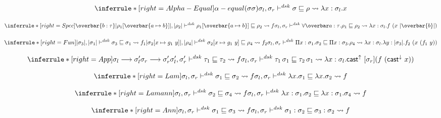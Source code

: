 
\[
\inferrule*[right=Alpha-Equal]
{  \alpha-equal(\sigma \sigma)  }
{  \sigmal, \sigmar \polymorphicstar \sigma \sqsubseteq \rho \transto{\lambda x: \sigmal. x}}
\]

\[
\inferrule*[right=Spec]
{\overbar{b: \tau} \\
\translated{\rho_1[\overbar{\tpmapsto \tau a b}]}, \translated{\rho_2} \polymorphicstar \rho_1[\overbar{\tpmapsto \tau a b}] \sqsubseteq \rho_2 \transto{f} \\
}
{\sigmal, \sigmar \polymorphicstar \forallvars{a:\tau}.\rho_1 \sqsubseteq \rho_2 \\
\transto {\lambda x:\sigmal. f\ (x\ \translated{\overbar{b}}) }}
\]

\[
\inferrule*[right=Fun]
{\translated{\sigma_3}, \translated{\sigma_1}\polymorphic  \sigma_3 \sqsubseteq \sigma_1 \transto{f_1} \\
\translated{\sigma_2[x \mapsto g_1\ y]}, \translated{\rho_4}\polymorphicstar  \sigma_2[x \mapsto g_1\ y] \sqsubseteq \rho_4 \transto{f_2} \\
 }
{\sigmal, \sigmar \polymorphicstar \Pi x:\sigma_1. \sigma_2 \sqsubseteq \Pi x:\sigma_3. \rho_4 \\
\transto {\lambda x:\sigmal. \lambda y:\translated{\sigma_3} . f_2\ (x\ (f_1\ y))}
}
\]

\[
\inferrule*[right=App]
{\sigmal \longrightarrow \sigmal' \\
\sigmar \longrightarrow \sigmar' \\
\sigmal', \sigmar' \polymorphicstar \tau_1 \sqsubseteq \tau_2 \transto {f}\\
}
{\sigmal, \sigmar \polymorphicstar \tau_1\, \sigma_1 \sqsubseteq \tau_2\, \sigma_1 \\
\transto {\lambda x:\sigmal. \castupe [\sigmar] (f\ (\castdowne x))}}
\]

\[
\inferrule*[right=Lam]
{
\sigmal, \sigmar \polymorphic \sigma_1 \sqsubseteq \sigma_2 \transto {f}}
{ \sigmal, \sigmar \polymorphicstar \lambda x. \sigma_1 \sqsubseteq \lambda x. \sigma_2 \transto {f}}
\]


\[
\inferrule*[right=Lamann]
{
\sigmal, \sigmar \polymorphic \sigma_2 \sqsubseteq \sigma_4 \transto{f}}
{\sigmal, \sigmar \polymorphicstar \lambda x:\sigma_1. \sigma_2 \sqsubseteq \lambda x:\sigma_1. \sigma_4 \\
\transto {f}}
\]


\[
\inferrule*[right=Ann]
{
\sigmal, \sigmar \polymorphic  \sigma_1 \sqsubseteq \sigma_3 \transto{f}}
{\sigmal, \sigmar \polymorphicstar \sigma_1:\sigma_2 \sqsubseteq \sigma_3:\sigma_2 \transto {f}}
\]


